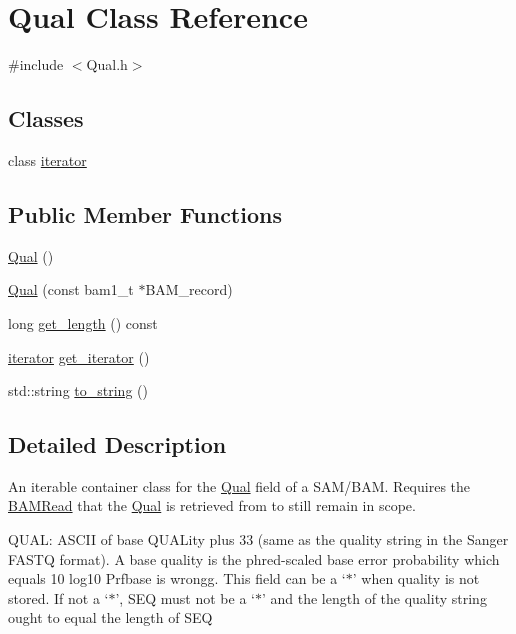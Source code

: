 \hypertarget{class_qual}{
\section{Qual Class Reference}
\label{class_qual}
}


{\ttfamily \#include $<$Qual.h$>$}

\subsection*{Classes}
\begin{DoxyCompactItemize}
\item 
class \hyperlink{class_qual_1_1iterator}{iterator}
\end{DoxyCompactItemize}
\subsection*{Public Member Functions}
\begin{DoxyCompactItemize}
\item 
\hyperlink{class_qual_ab55cb07969dae617e7bdfcce5a300790}{Qual} ()
\item 
\hyperlink{class_qual_aaa4dc2fa33957d220dc73ce7a8f6029e}{Qual} (const bam1\_\-t $\ast$BAM\_\-record)
\item 
long \hyperlink{class_qual_a2b551ccb1ea195e512b9e884a1d868e0}{get\_\-length} () const 
\item 
\hyperlink{class_qual_1_1iterator}{iterator} \hyperlink{class_qual_adf8165f7cf097f0ebea7d62eda8a9643}{get\_\-iterator} ()
\item 
std::string \hyperlink{class_qual_a6989dc35c5caea52df248448d782d486}{to\_\-string} ()
\end{DoxyCompactItemize}


\subsection{Detailed Description}
An iterable container class for the \hyperlink{class_qual}{Qual} field of a SAM/BAM. Requires the \hyperlink{class_b_a_m_read}{BAMRead} that the \hyperlink{class_qual}{Qual} is retrieved from to still remain in scope.

QUAL: ASCII of base QUALity plus 33 (same as the quality string in the Sanger FASTQ format). A base quality is the phred-\/scaled base error probability which equals 10 log10 Prfbase is wrongg. This field can be a `$\ast$' when quality is not stored. If not a `$\ast$', SEQ must not be a `$\ast$' and the length of the quality string ought to equal the length of SEQ 

